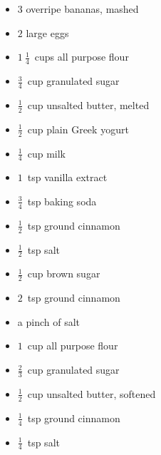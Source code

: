 \documentclass{article}
\begin{document}



\begin{minipage}{\textwidth}
\thispagestyle{firstpage}

\ingredients
\begin{multicols*}{3}
\begin{minipage}{\linewidth}
\ingredients[Cake]
\begin{itemize}
    \item $3$ overripe bananas, mashed
    \item $2$ large eggs
    \item $1~\frac{1}{4}$~cups all purpose flour
    \item $\frac{3}{4}$~cup granulated sugar
    \item $\frac{1}{2}$~cup unsalted butter, melted
    \item $\frac{1}{2}$~cup plain Greek yogurt
    \item $\frac{1}{4}$~cup milk
    \item $1$~tsp vanilla extract
    \item $\frac{3}{4}$~tsp baking soda
    \item $\frac{1}{2}$~tsp ground cinnamon
    \item $\frac{1}{2}$~tsp salt
\end{itemize}
\end{minipage}

\columnbreak
\begin{minipage}{\linewidth}
\begin{itemize}
    \item $\frac{1}{2}$~cup brown sugar
    \item $2$~tsp ground cinnamon
    \item a pinch of salt
\end{itemize}
\end{minipage}

\columnbreak
\begin{minipage}{\linewidth}
\begin{itemize}
    \item $1$~cup all purpose flour
    \item $\frac{2}{3}$~cup granulated sugar
    \item $\frac{1}{2}$~cup unsalted butter, softened
    \item $\frac{1}{4}$~tsp ground cinnamon
    \item $\frac{1}{4}$~tsp salt
\end{itemize}
\end{minipage}
\end{multicols*}


\end{minipage}
\end{document}
